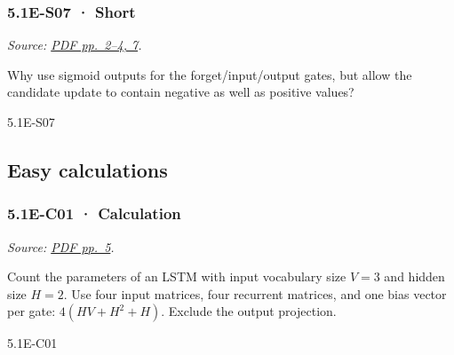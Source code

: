 \noindent\begin{minipage}{\linewidth}

\subsubsection{5.1E-S07 · Short}\label{e-s07-short}

\emph{Source:
\href{../Lecture\%20Slides/5.1.\%20Extra\%20Material.pdf\#page=2}{PDF
pp.~2--4, 7}.}

Why use sigmoid outputs for the forget/input/output gates, but allow the
candidate update to contain negative as well as positive values?

\begin{solution}[20mm]{5.1E-S07}

\end{solution}
\end{minipage}\par\medskip

\subsection{Easy calculations}\label{easy-calculations-13}

\noindent\begin{minipage}{\linewidth}

\subsubsection{5.1E-C01 · Calculation}\label{e-c01-calculation}

\emph{Source:
\href{../Lecture\%20Slides/5.1.\%20Extra\%20Material.pdf\#page=5}{PDF
pp.~5}.}

Count the parameters of an LSTM with input vocabulary size \(V=3\) and
hidden size \(H=2\). Use four input matrices, four recurrent matrices,
and one bias vector per gate: \(4(HV+H^2+H)\). Exclude the output
projection.

\begin{solution}[26mm]{5.1E-C01}

\end{solution}
\end{minipage}\par\medskip

